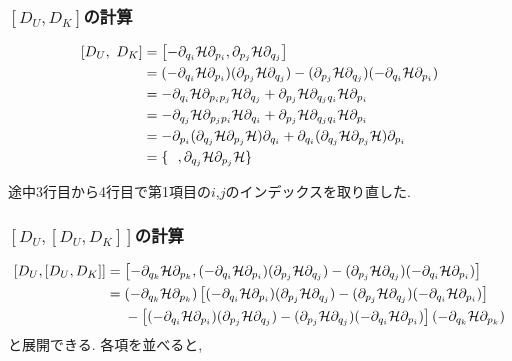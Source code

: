 \subsubsection{$[D_{U}, D_{K}]$の計算}
\begin{align}
  \left[D_{U},~D_{K}\right]
  &=
  \left[
    -\partial_{q_{i}} \mathcal{H} \partial_{p_{i}},
     \partial_{p_{j}} \mathcal{H} \partial_{q_{j}}
  \right]
  \notag \\
  &=
  (-\partial_{q_{i}} \mathcal{H} \partial_{p_{i}})
  ( \partial_{p_{j}} \mathcal{H} \partial_{q_{j}})
  -
  ( \partial_{p_{j}} \mathcal{H} \partial_{q_{j}})
  (-\partial_{q_{i}} \mathcal{H} \partial_{p_{i}})
  \notag \\
  &=
  -\partial_{q_{i}} \mathcal{H} \partial_{p_{i} p_{j}} \mathcal{H} \partial_{q_{j}}
  +\partial_{p_{j}} \mathcal{H} \partial_{q_{j} q_{i}} \mathcal{H} \partial_{p_{i}}
  \notag \\
  &=
  -\partial_{q_{j}} \mathcal{H} \partial_{p_{j} p_{i}} \mathcal{H} \partial_{q_{i}}
  +\partial_{p_{j}} \mathcal{H} \partial_{q_{j} q_{i}} \mathcal{H} \partial_{p_{i}}
  \notag \\
  &=
  -\partial_{p_{i}}
  (\partial_{q_{j}} \mathcal{H} \partial_{p_{j}} \mathcal{H})
  \partial_{q_{i}}
  +\partial_{q_{i}}
   (\partial_{q_{j}} \mathcal{H} \partial_{p_{j}} \mathcal{H})
   \partial_{p_{i}}
  \notag \\
  &=
  \{~~, \partial_{q_{j}} \mathcal{H} \partial_{p_{j}} \mathcal{H}\}
  \notag
\end{align}

途中3行目から4行目で第1項目の$i$,$j$のインデックスを取り直した.

\subsubsection{$[D_{U}, [D_{U}, D_{K}]]$の計算}

\begin{align}
  \left[D_{U}, [D_{U}, D_{K}]\right]
  &=
  \left[
     -\partial_{q_{k}} \mathcal{H} \partial_{p_{k}},
     (-\partial_{q_{i}} \mathcal{H} \partial_{p_{i}})
     ( \partial_{p_{j}} \mathcal{H} \partial_{q_{j}})
     -
     ( \partial_{p_{j}} \mathcal{H} \partial_{q_{j}})
     (-\partial_{q_{i}} \mathcal{H} \partial_{p_{i}})
  \right]
  \notag \\
  &=
  (-\partial_{q_{k}} \mathcal{H} \partial_{p_{k}})
  \left[
    (-\partial_{q_{i}} \mathcal{H} \partial_{p_{i}})
    ( \partial_{p_{j}} \mathcal{H} \partial_{q_{j}})
    -
    ( \partial_{p_{j}} \mathcal{H} \partial_{q_{j}})
    (-\partial_{q_{i}} \mathcal{H} \partial_{p_{i}})
  \right]
  \notag \\
  &~~~~ -
  \left[
    (-\partial_{q_{i}} \mathcal{H} \partial_{p_{i}})
    ( \partial_{p_{j}} \mathcal{H} \partial_{q_{j}})
    -
    ( \partial_{p_{j}} \mathcal{H} \partial_{q_{j}})
    (-\partial_{q_{i}} \mathcal{H} \partial_{p_{i}})
  \right]
  (-\partial_{q_{k}} \mathcal{H} \partial_{p_{k}})
  \notag
\end{align}
と展開できる. 各項を並べると,

